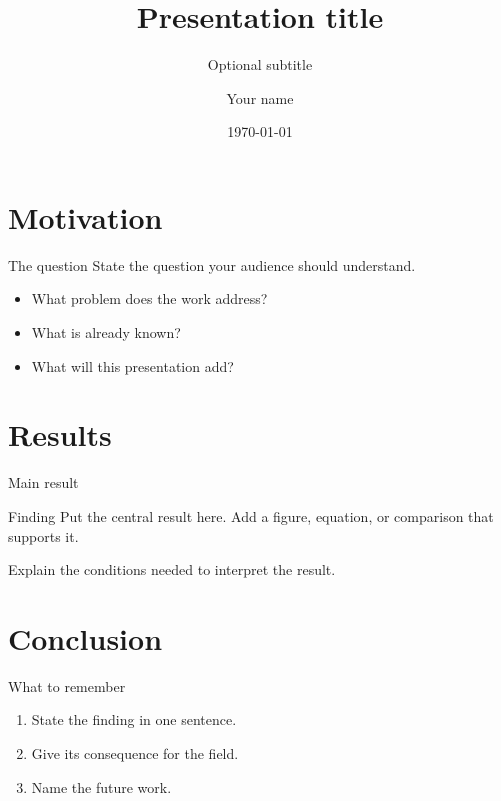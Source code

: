\documentclass[aspectratio=169,10pt]{beamer}
\title[Short title]{Presentation title}
\subtitle{Optional subtitle}
\author[Your name]{Your name}
\institute[WVU]{West Virginia University}
\date{\today}
\begin{document}
\maketitle

\section{Motivation}
\begin{frame}{The question}
  State the question your audience should understand.
  \begin{itemize}
    \item What problem does the work address?
    \item What is already known?
    \item What will this presentation add?
  \end{itemize}
\end{frame}

\section{Results}
\begin{frame}{Main result}
  \begin{block}{Finding}
    Put the central result here. Add a figure, equation, or comparison
    that supports it.
  \end{block}
  \begin{information}[Context]
    Explain the conditions needed to interpret the result.
  \end{information}
\end{frame}

\section{Conclusion}
\begin{frame}{What to remember}
  \begin{enumerate}
    \item State the finding in one sentence.
    \item Give its consequence for the field.
    \item Name the future work.
  \end{enumerate}
\end{frame}

\end{document}
